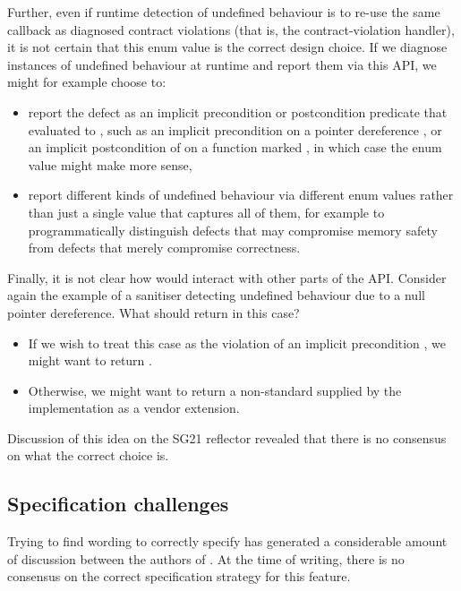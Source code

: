 Further, even if runtime detection of undefined behaviour is to re-use the same callback as diagnosed contract violations (that is, the contract-violation handler), it is not certain that this enum value is the correct design choice. If we diagnose instances of undefined behaviour at runtime and report them via this API, we might for example choose to:
\begin{itemize}
\item report the defect as an implicit precondition or postcondition predicate that evaluated to , such as an implicit precondition  on a pointer dereference , or an implicit postcondition of  on a function marked \tcode{[[noreturn]]}, in which case the enum value  might make more sense,
\item report different kinds of undefined behaviour via different enum values rather than just a single value that captures all of them, for example to programmatically distinguish defects that may compromise memory safety from defects that merely compromise correctness.
\end{itemize}
Finally, it is not clear how \mbox{} would interact with other parts of the \mbox{} API. Consider again the example of a sanitiser detecting undefined behaviour due to a null pointer dereference. What should  return in this case?
\begin{itemize}
\item If we wish to treat this case as the violation of an implicit precondition , we might want to return .
\item Otherwise, we might want to return a non-standard  supplied by the implementation as a vendor extension.
\end{itemize}
Discussion of this idea on the SG21 reflector revealed that there is no consensus on what the correct choice is.

\subsection{Specification challenges}

Trying to find wording to correctly specify \mbox{} has generated a considerable amount of discussion between the authors of \cite{P2900R4}. At the time of writing, there is no consensus on the correct specification strategy for this feature.

